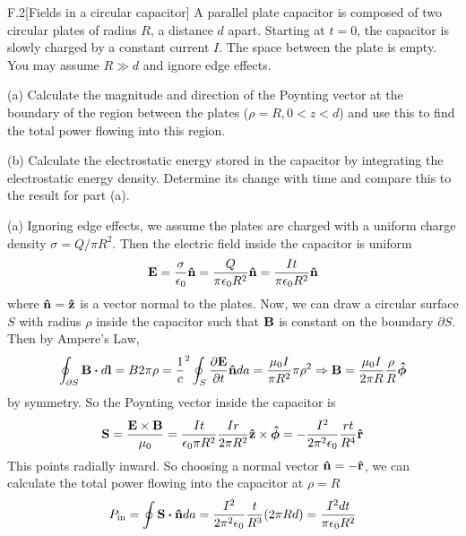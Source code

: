 \documentclass[12pt]{article}
\begin{document}
\begin{problem}{F.2}[Fields in a circular capacitor]
A parallel plate capacitor is composed of two circular plates of radius $R$, a
distance $d$ apart. Starting at $t=0$, the capacitor is slowly charged by a
constant current $I$. The space between the plate is empty. You may assume $R\gg
d$ and ignore edge effects.

(a) Calculate the magnitude and direction of the Poynting vector at the boundary
of the region between the plates ($\rho=R,0<z<d$) and use this to find the total
power flowing into this region.

(b) Calculate the electrostatic energy stored in the capacitor by integrating
the electrostatic energy density. Determine its change with time and compare
this to the result for part (a).
\begin{solution}
(a) Ignoring edge effects, we assume the plates are charged with a uniform 
charge density $\sigma=Q/\pi R^2$. Then the electric field inside the capacitor
is uniform
\begin{equation}\label{p2a:E}
    \vb{E}=\frac{\sigma}{\epsilon_0}\vb{\hat{n}}=\frac{Q}{\pi\epsilon_0R^2}\vb{\hat{n}}
    =\frac{It}{\pi\epsilon_0R^2}\vb{\hat{n}}
\end{equation}
where $\vb{\hat{n}}=\vb{\hat{z}}$ is a vector normal to the plates. Now, we can
draw a circular surface $S$ with radius $\rho$ inside the capacitor such that
$\vb{B}$ is constant on the boundary $\partial S$. Then by Ampere's Law,
\begin{equation}\label{p2a:B}
    \oint_{\partial S}\vb{B}\vdot d\vb{l}=B2\pi
    \rho=\frac1c^2\oint_S\frac{\partial\vb{E}}{\partial t}\nhat
    da=\frac{\mu_0I}{\pi R^2} \pi \rho^2\Rightarrow
    \vb{B}=\frac{\mu_0I}{2\pi R}\frac{\rho}{R}\phihat
\end{equation}
by symmetry. So the Poynting vector inside the capacitor is
\begin{equation}
    \vb{S}=\frac{\vb{E}\times\vb{B}}{\mu_0}=\frac{It}{\epsilon_0\pi
    R^2}\frac{Ir}{2\pi R^2}\vb{\hat{z}}\times\bm{\hat{\phi}}
    =-\frac{I^2}{2\pi^2\epsilon_0}\frac{rt}{R^4}\vb{\hat{r}}
\end{equation}
This points radially inward. So choosing a normal vector $\vb{\hat{n}}=-\vb{\hat{r}}$, we can
calculate the total power flowing into the capacitor at $\rho=R$
\begin{equation}
    P_\text{in}=\oint\vb{S}\vdot\nhat da
    =\frac{I^2}{2\pi^2\epsilon_0}\frac{t}{R^3}(2\pi
    Rd)=\frac{I^2dt}{\pi\epsilon_0R^2}
\end{equation}


\end{solution}
\end{problem}
\end{document}
